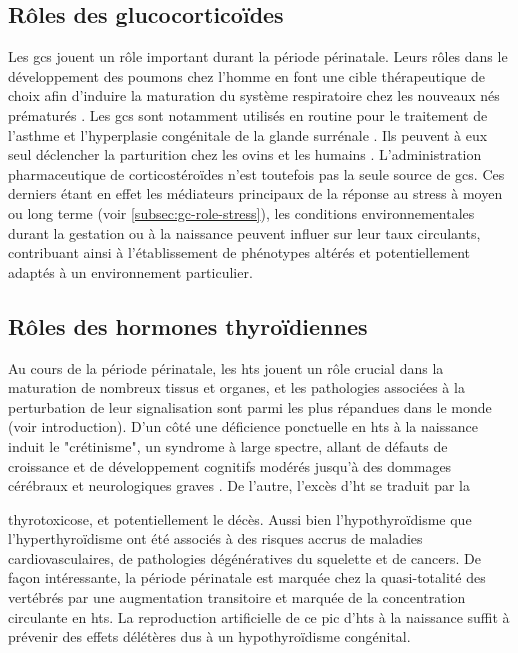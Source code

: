 \documentclass[../main.tex]{subfiles}
\begin{document}

\subsection{Rôles des glucocorticoïdes}

Les \glspl{gc} jouent un rôle important durant la période périnatale.
Leurs rôles dans le développement des poumons chez l'homme en font une cible thérapeutique de choix afin d'induire la maturation du système respiratoire chez les nouveaux nés prématurés \citep{NGC2010}.
Les \glspl{gc} sont notamment utilisés en routine pour le traitement de l'asthme \citep{Clifton2005,Osei-Kumah2011} et l'hyperplasie congénitale de la glande surrénale \citep{Forest2004}.
Ils peuvent à eux seul déclencher la parturition chez les ovins et les humains \citep{Mati1973,Whittle2001}.
L’administration pharmaceutique de corticostéroïdes n'est toutefois pas la seule source de \glspl{gc}.
Ces derniers étant en effet les médiateurs principaux de la réponse au stress à moyen ou long terme (voir \autoref{subsec:gc-role-stress}), les conditions environnementales durant la gestation ou à la naissance peuvent influer sur leur taux circulants, contribuant ainsi à l'établissement de phénotypes altérés et potentiellement adaptés à un environnement particulier.


\subsection{Rôles des hormones thyroïdiennes}

Au cours de la période périnatale, les \glspl{ht} jouent un rôle crucial dans la maturation de nombreux tissus et organes, et les pathologies associées à la perturbation de leur signalisation sont parmi les plus répandues dans le monde (voir introduction).
D'un côté une déficience ponctuelle en \glspl{ht} à la naissance induit le "crétinisme", un syndrome à large spectre, allant de défauts de croissance et de développement cognitifs modérés jusqu'à des dommages cérébraux et neurologiques graves \citep{Delange1994,Chen2010}.
De l'autre, l'excès d'\gls{ht} se traduit par la\begin{center}

\end{center} thyrotoxicose, et potentiellement le décès.
Aussi bien l'hypothyroïdisme que l'hyperthyroïdisme ont été associés à des risques accrus de maladies cardiovasculaires, de pathologies dégénératives du squelette et de cancers.
De façon intéressante, la période périnatale est marquée chez la quasi-totalité des vertébrés par une augmentation transitoire et marquée de la concentration circulante en \glspl{ht}.
La reproduction artificielle de ce pic d'\glspl{ht} à la naissance suffit à prévenir des effets délétères dus à un hypothyroïdisme congénital.
\end{document}
